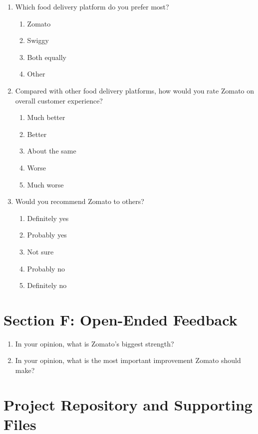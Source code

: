 \begin{enumerate}[resume,label=\textbf{Q\arabic*.}]
    \item Which food delivery platform do you prefer most?
    \begin{enumerate}[label=\alph*.]
        \item Zomato
        \item Swiggy
        \item Both equally
        \item Other
    \end{enumerate}

    \item Compared with other food delivery platforms, how would you rate Zomato on overall customer experience?
    \begin{enumerate}[label=\alph*.]
        \item Much better
        \item Better
        \item About the same
        \item Worse
        \item Much worse
    \end{enumerate}

    \item Would you recommend Zomato to others?
    \begin{enumerate}[label=\alph*.]
        \item Definitely yes
        \item Probably yes
        \item Not sure
        \item Probably no
        \item Definitely no
    \end{enumerate}
\end{enumerate}

\section*{Section F: Open-Ended Feedback}

\begin{enumerate}[resume,label=\textbf{Q\arabic*.}]
    \item In your opinion, what is Zomato's biggest strength?
    \item In your opinion, what is the most important improvement Zomato should make?
\end{enumerate}

\section*{Project Repository and Supporting Files}

